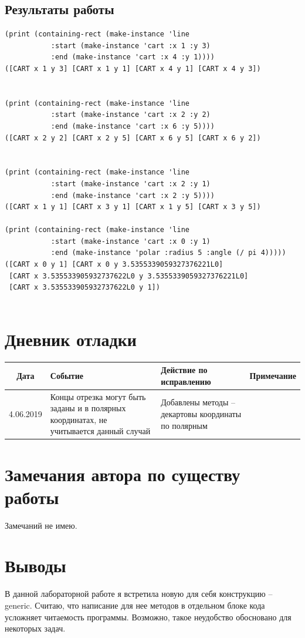 \documentclass[12pt]{article}
\begin{document}
\subsection{Результаты работы}
\begin{lstlisting}             
(print (containing-rect (make-instance 'line
           :start (make-instance 'cart :x 1 :y 3)
           :end (make-instance 'cart :x 4 :y 1))))
([CART x 1 y 3] [CART x 1 y 1] [CART x 4 y 1] [CART x 4 y 3]) 

        
(print (containing-rect (make-instance 'line
           :start (make-instance 'cart :x 2 :y 2)
           :end (make-instance 'cart :x 6 :y 5))))
([CART x 2 y 2] [CART x 2 y 5] [CART x 6 y 5] [CART x 6 y 2]) 


(print (containing-rect (make-instance 'line
           :start (make-instance 'cart :x 2 :y 1)
           :end (make-instance 'cart :x 2 :y 5))))
([CART x 1 y 1] [CART x 3 y 1] [CART x 1 y 5] [CART x 3 y 5])

(print (containing-rect (make-instance 'line
           :start (make-instance 'cart :x 0 :y 1)
           :end (make-instance 'polar :radius 5 :angle (/ pi 4)))))
([CART x 0 y 1] [CART x 0 y 3.5355339059327376221L0]
 [CART x 3.535533905932737622L0 y 3.5355339059327376221L0]
 [CART x 3.535533905932737622L0 y 1]) 
           
\end{lstlisting}

\section{Дневник отладки}
\begin{tabular}{|c|p{5cm}|p{5cm}|p{3cm}|}
\hline
Дата & Событие & Действие по исправлению & Примечание \\
\hline
4.06.2019 & Концы отрезка могут быть заданы и в полярных координатах, не учитывается данный случай & Добавлены методы -- декартовы координаты по полярным & \\
\hline
\end{tabular}

\section{Замечания автора по существу работы}
Замечаний не имею.

\section{Выводы}
В данной лабораторной работе я встретила новую для себя конструкцию -- generic. Считаю, что написание для нее методов в отдельном блоке кода усложняет читаемость программы. Возможно, такое неудобство обосновано для некоторых задач.
\end{document}
